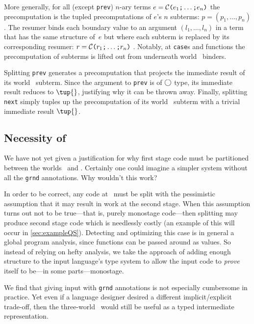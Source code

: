 \begin{abstrsyn}
More generally, for all (except \texttt{prev}) 
$n$-ary terms $e = \mathcal{C}\texttt{(} e_1 \texttt{;} \ldots \texttt{;} e_n \texttt{)}$ 
the precomputation is the tupled precomputations of $e$'s $n$ subterms:
$p=(p_1,\ldots,p_n)$.  The resumer binds each boundary value to an
argument $(l_1,\ldots,l_n)$ in a term that has the same structure
of~$e$ but where each subterm is replaced by its corresponding resumer:
$r = \mathcal{C}\texttt{(} r_1 \texttt{;} \ldots \texttt{;} r_n \texttt{)}$ .
Notably, at \texttt{case}s and functions the
precomputation of subterms is lifted out from underneath world \bbtwo\ binders.  

Splitting \texttt{prev} generates a precomputation that projects the immediate
result of its world \bbone\ subterm.
Since the argument to \texttt{prev} is of $\bigcirc$ type, its immediate result reduces to $\tup{}$, justifying why it can be thrown away.
Finally, splitting \texttt{next} simply tuples up the precomputation of its
world \bbtwo\ subterm with a trivial immediate result $\tup{}$.

\subsection {Necessity of \bbonep}
\label{sec:needGround}

We have not yet given a justification for why first stage code must be
partitioned between the worlds \bbonem\ and \bbonep.
Certainly one could imagine a simpler system without all the \texttt{grnd} annotations.  
Why wouldn't this work?

In order to be correct, any code at \bbonem\ must be split with the 
pessimistic assumption that it may result in work at the second stage.
When this assumption turns out not to be true---that is, purely monostage code---then 
splitting may produce second stage code which is needlessly costly 
(an example of this will occur in \ref{sec:exampleQS}).
Detecting and optimizing this case is in general a global program analysis,
since functions can be passed around as values.  
So instead of relying on hefty analysis, 
we take the approach of adding enough structure to the input language's type system to
allow the input code to {\em prove} itself to be---in some parts---monostage.

We find that giving input with \texttt{grnd} annotations is not especially cumbersome in practice.
Yet even if a language designer desired a different implicit/explicit trade-off,
then the three-world \lang\ would still be useful as a typed intermediate representation.

\end{abstrsyn}



